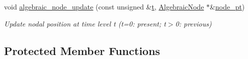 \begin{DoxyCompactItemize}
void \hyperlink{classoomph_1_1AlgebraicChannelWithLeafletMesh_a4c01b99ca83286f872c517fc5269a890}{algebraic\+\_\+node\+\_\+update} (const unsigned \&\hyperlink{cfortran_8h_af6f0bd3dc13317f895c91323c25c2b8f}{t}, \hyperlink{classoomph_1_1AlgebraicNode}{Algebraic\+Node} $\ast$\&\hyperlink{classoomph_1_1AlgebraicMesh_aedeebbe95d2f8e67e9939cecd1be3933}{node\+\_\+pt})
\begin{DoxyCompactList}\small\item\em Update nodal position at time level t (t=0\+: present; t$>$0\+: previous) \end{DoxyCompactList}\end{DoxyCompactItemize}
\subsection*{Protected Member Functions}
